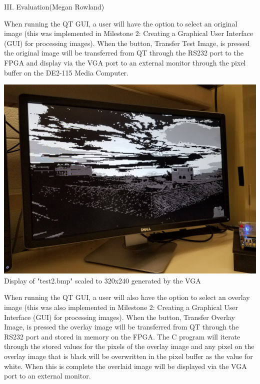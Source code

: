 \documentclass{article}
\newenvironment{Figure}
  {\par\medskip\noindent\ignorespaces\minipage{\linewidth}}
  {\endminipage\par\medskip}
\begin{document}
\begin{multicols*}{2}
\begin{center}
\large{III. Evaluation(Megan Rowland)}
\end{center}

When running the QT GUI, a user will have the option to select an original image (this was implemented in Milestone 2: Creating a Graphical User Interface (GUI) for processing images). When the button, Transfer Test Image, is pressed the original image will be transferred from QT through the RS232 port to the FPGA and display via the VGA port to an external monitor through the pixel buffer on the DE2-115 Media Computer. 

\begin{Figure}
 \centering
 \includegraphics[width=\linewidth]{original_image_transfer.jpg}
   {Display of "test2.bmp" scaled to 320x240 generated by the VGA}
\end{Figure}


When running the QT GUI, a user will also have the option to select an overlay image (this was also implemented in Milestone 2: Creating a Graphical User Interface (GUI) for processing images). When the button, Transfer Overlay Image, is pressed the overlay image will be transferred from QT through the RS232 port and stored in memory on the FPGA. The C program will iterate through the stored values for the pixels of the overlay image and any pixel on the overlay image that is black will be overwritten in the pixel buffer as the value for white. When this is complete the overlaid image will be displayed via the VGA port to an external monitor.


\end{multicols*}
\end{document}
